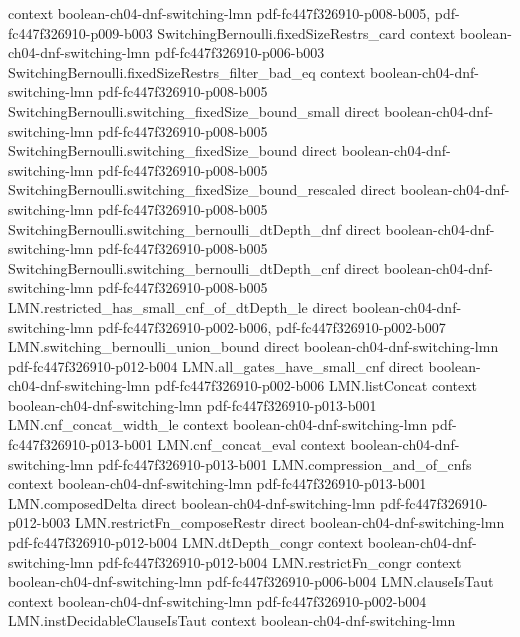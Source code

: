 \begin{lemma}
  {context}
  {boolean-ch04-dnf-switching-lmn}
  {pdf-fc447f326910-p008-b005,
    pdf-fc447f326910-p009-b003}
\proofstep
  {SwitchingBernoulli.fixedSizeRestrs_card}
  {context}
  {boolean-ch04-dnf-switching-lmn}
  {pdf-fc447f326910-p006-b003}
\proofstep
  {SwitchingBernoulli.fixedSizeRestrs_filter_bad_eq}
  {context}
  {boolean-ch04-dnf-switching-lmn}
  {pdf-fc447f326910-p008-b005}
\proofstep
  {SwitchingBernoulli.switching_fixedSize_bound_small}
  {direct}
  {boolean-ch04-dnf-switching-lmn}
  {pdf-fc447f326910-p008-b005}
\proofstep
  {SwitchingBernoulli.switching_fixedSize_bound}
  {direct}
  {boolean-ch04-dnf-switching-lmn}
  {pdf-fc447f326910-p008-b005}
\proofstep
  {SwitchingBernoulli.switching_fixedSize_bound_rescaled}
  {direct}
  {boolean-ch04-dnf-switching-lmn}
  {pdf-fc447f326910-p008-b005}
\proofstep
  {SwitchingBernoulli.switching_bernoulli_dtDepth_dnf}
  {direct}
  {boolean-ch04-dnf-switching-lmn}
  {pdf-fc447f326910-p008-b005}
\proofstep
  {SwitchingBernoulli.switching_bernoulli_dtDepth_cnf}
  {direct}
  {boolean-ch04-dnf-switching-lmn}
  {pdf-fc447f326910-p008-b005}
\proofstep
  {LMN.restricted_has_small_cnf_of_dtDepth_le}
  {direct}
  {boolean-ch04-dnf-switching-lmn}
  {pdf-fc447f326910-p002-b006,
    pdf-fc447f326910-p002-b007}
\proofstep
  {LMN.switching_bernoulli_union_bound}
  {direct}
  {boolean-ch04-dnf-switching-lmn}
  {pdf-fc447f326910-p012-b004}
\proofstep
  {LMN.all_gates_have_small_cnf}
  {direct}
  {boolean-ch04-dnf-switching-lmn}
  {pdf-fc447f326910-p002-b006}
\proofstep
  {LMN.listConcat}
  {context}
  {boolean-ch04-dnf-switching-lmn}
  {pdf-fc447f326910-p013-b001}
\proofstep
  {LMN.cnf_concat_width_le}
  {context}
  {boolean-ch04-dnf-switching-lmn}
  {pdf-fc447f326910-p013-b001}
\proofstep
  {LMN.cnf_concat_eval}
  {context}
  {boolean-ch04-dnf-switching-lmn}
  {pdf-fc447f326910-p013-b001}
\proofstep
  {LMN.compression_and_of_cnfs}
  {context}
  {boolean-ch04-dnf-switching-lmn}
  {pdf-fc447f326910-p013-b001}
\proofstep
  {LMN.composedDelta}
  {direct}
  {boolean-ch04-dnf-switching-lmn}
  {pdf-fc447f326910-p012-b003}
\proofstep
  {LMN.restrictFn_composeRestr}
  {direct}
  {boolean-ch04-dnf-switching-lmn}
  {pdf-fc447f326910-p012-b004}
\proofstep
  {LMN.dtDepth_congr}
  {context}
  {boolean-ch04-dnf-switching-lmn}
  {pdf-fc447f326910-p012-b004}
\proofstep
  {LMN.restrictFn_congr}
  {context}
  {boolean-ch04-dnf-switching-lmn}
  {pdf-fc447f326910-p006-b004}
\proofstep
  {LMN.clauseIsTaut}
  {context}
  {boolean-ch04-dnf-switching-lmn}
  {pdf-fc447f326910-p002-b004}
\proofstep
  {LMN.instDecidableClauseIsTaut}
  {context}
  {boolean-ch04-dnf-switching-lmn}

\end{lemma}
